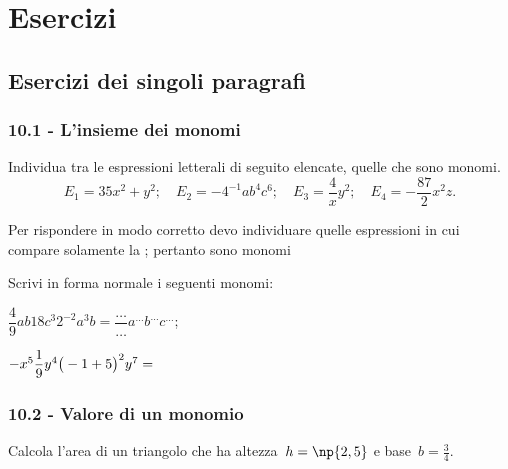 \section{Esercizi}
\subsection{Esercizi dei singoli paragrafi}
\subsubsection*{10.1 - L'insieme dei monomi}
\begin{esercizio}
\label{ese:10.1}
Individua tra le espressioni letterali di seguito elencate, quelle che sono monomi.
\[E_{1}=35x^{2}+y^{2};\quad E_{2}=-4^{-1}ab^{4}c^{6};\quad E_{3}=\dfrac{4}{x}y^{2};\quad E_{4}=-{\frac{87}{2}}x^{2}z.\]

Per rispondere in modo corretto devo individuare quelle espressioni in
cui compare solamente la \dotfill; pertanto sono monomi \dotfill
\end{esercizio}

\begin{esercizio}
\label{ese:10.2}
Scrivi in forma normale i seguenti monomi:
\begin{multicols}{2}
\begin{enumeratea}
 \item $\dfrac{4}{9}ab18c^{3}2^{-2}a^{3}b=\dfrac{\ldots }{\ldots }a^{\ldots}b^{\ldots }c^{\ldots }$;
 \item $-x^{5}\dfrac{1}{9}y^{4}\big(-1+5\big)^{2}y^{7}=\dotfill~$
\end{enumeratea}
\end{multicols}
\end{esercizio}


\subsubsection*{10.2 - Valore di un monomio}

\begin{esercizio}
\label{ese:10.3} %
Calcola l'area di un triangolo che ha altezza~$h=\np{2,5}$ e base~$b=\frac{3}{4}$.
\end{esercizio}

